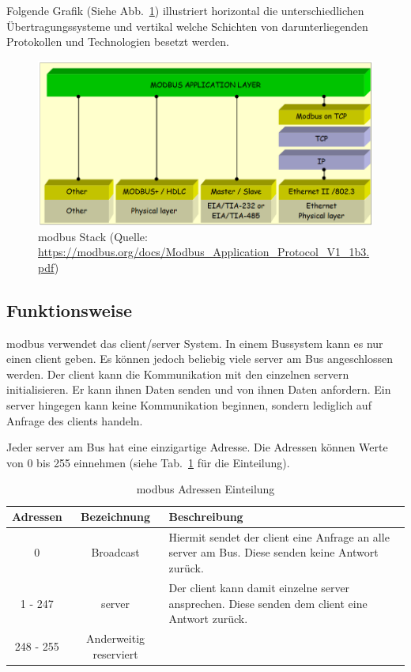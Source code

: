 Folgende Grafik (Siehe Abb.~\ref{fig:modbus_stack}) illustriert horizontal die unterschiedlichen Übertragungssysteme und vertikal welche Schichten von darunterliegenden Protokollen und Technologien besetzt werden.
\begin{figure}[H]
	\centering
	\includegraphics[width=1.0\linewidth]{Bilder/Modbus_layers}
	\caption{\gls{modbus} Stack (Quelle: \url{https://modbus.org/docs/Modbus_Application_Protocol_V1_1b3.pdf})}
	\label{fig:modbus_stack}
\end{figure}

\subsection{Funktionsweise} \label{modbus_funktionsweise}
\gls{modbus} verwendet das \gls{client}/\gls{server} System. In einem Bussystem kann es nur einen \gls{client} geben. Es können jedoch beliebig viele \gls{server} am Bus angeschlossen werden. Der \gls{client} kann die Kommunikation mit den einzelnen \gls{server}n initialisieren. Er kann ihnen Daten senden und von ihnen Daten anfordern. Ein \gls{server} hingegen kann keine Kommunikation beginnen, sondern lediglich auf Anfrage des \gls{client}s handeln.

Jeder \gls{server} am Bus hat eine einzigartige Adresse. Die Adressen können Werte von 0 bis 255 einnehmen (siehe Tab.~\ref{tab:modbus_adressen} für die Einteilung). 
\begin{table}[H]
	\caption{\gls{modbus} Adressen Einteilung \label{tab:modbus_adressen}}
	\begin{tabularx}{\textwidth}{@{}c|c|X@{}}
		\toprule
		\textbf{Adressen} & \textbf{Bezeichnung} & \textbf{Beschreibung} \\
		\midrule
		0 & Broadcast & Hiermit sendet der \gls{client} eine Anfrage an alle \gls{server} am Bus. Diese senden keine Antwort zurück. \\
		1 - 247 & \gls{server} & Der \gls{client} kann damit einzelne \gls{server} ansprechen. Diese senden dem \gls{client} eine Antwort zurück. \\
		248 - 255 & Anderweitig reserviert & \\
		\bottomrule
	\end{tabularx}
\end{table}

